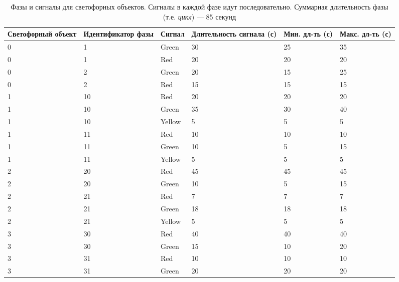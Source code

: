 \documentclass[12pt]{article}
\begin{document}
\begin{table}[h!]
\centering
\small
\caption{Фазы и сигналы для светофорных объектов. Сигналы в каждой фазе идут последовательно. Суммарная длительность фазы (т.е. \textit{цикл}) — 85 секунд}
\begin{tabular}{|p{2.6cm}|p{3.2cm}|p{1.4cm}|p{3.2cm}|p{1.5cm}|p{1.5cm}|}
\hline
\textbf{Светофорный объект} & \textbf{Идентификатор фазы} & \textbf{Сигнал} & \textbf{Длительность сигнала (с)} & \textbf{Мин. дл-ть (с)} & \textbf{Макс. дл-ть (с)} \\
\hline
0 & 1 & Green & 30 & 25 & 35 \\
0 & 1 & Red   & 20 & 20 & 20 \\
0 & 2 & Green & 20 & 15 & 25 \\
0 & 2 & Red   & 15 & 15 & 15 \\
\hline
1 & 10 & Red   & 20 & 20 & 20 \\
1 & 10 & Green & 35 & 30 & 40 \\
1 & 10 & Yellow& 5  & 5  & 5  \\
1 & 11 & Red   & 10 & 10 & 10 \\
1 & 11 & Green & 10 & 5  & 15 \\
1 & 11 & Yellow& 5  & 5  & 5  \\
\hline
2 & 20 & Red   & 45 & 45 & 45 \\
2 & 20 & Green & 10 & 5  & 15 \\
2 & 21 & Red   & 7  & 7  & 7  \\
2 & 21 & Green & 18 & 18 & 18 \\
2 & 21 & Yellow& 5  & 5  & 5  \\
\hline
3 & 30 & Red   & 40 & 40 & 40 \\
3 & 30 & Green & 15 & 10 & 20 \\
3 & 31 & Red & 10 & 10 & 10 \\
3 & 31 & Green & 20 & 20 & 20 \\
\hline
\end{tabular}
\end{table}
\end{document}
